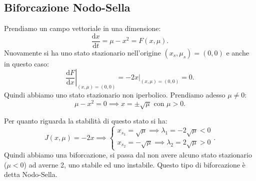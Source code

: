 \subsection{Biforcazione Nodo-Sella}%
Prendiamo un campo vettoriale in una dimensione:
\[
    \frac{\text{d} x}{\text{d} t} = \mu-x^2 = F(x, \mu) 
.\] 
Nuovamente si ha uno stato stazionario nell'origine $(x_s, \mu_s) = (0, 0)$  e anche in questo caso:
\[
    \left. \frac{\text{d} F}{\text{d} x} \right|_{(x, \mu) = (0, 0)}=\left.-2x\right|_{(x, \mu) = (0, 0) } = 0
.\] 
Quindi abbiamo uno stato stazionario non iperbolico. Prendiamo adesso $\mu\neq 0$: 
\[
    \mu-x^2 = 0 \implies  x = \pm\sqrt{\mu} \text{ con }\mu>0
.\] 

Per quanto riguarda la stabilità di questo stato si ha:
\[
    J(x, \mu) = -2x \implies  
    \begin{cases}
        x_{s_1}= \sqrt{\mu} \implies\lambda_1 = -2\sqrt{\mu} < 0 \\
        x_{s_2}= -\sqrt{\mu} \implies\lambda_2 = 2\sqrt{\mu} >0
    \end{cases}
.\] 
Quindi abbiamo una biforcazione, si passa dal non avere alcuno stato stazionario ($\mu<0$) ad averne 2, uno stabile ed uno instabile. Questo tipo di biforcazione è detta Nodo-Sella.

